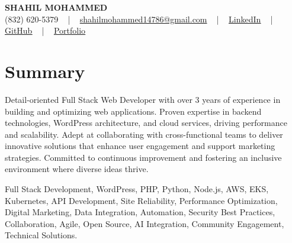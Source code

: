 \documentclass[letterpaper,10pt]{article}
\begin{document}
\begin{center}
    {\fontsize{14pt}{12pt}\selectfont \textbf{\MakeUppercase{Shahil Mohammed}}}\\ \vspace{2pt}
    \fontsize{10pt}{12pt}\selectfont (832) 620-5379 ~ | ~ \href{mailto:shahilmohammed14786@gmail.com}{shahilmohammed14786@gmail.com} ~ | ~  
    \href{https://www.linkedin.com/in/shahil-mohammed-9652931a1/}{\color{blue}\underline{LinkedIn}}  ~ | ~ 
    \href{https://github.com/freakbeast14}{\color{blue}\underline{GitHub}} ~ | ~ 
    \href{https://shahil-mohammed.netlify.app/}{\color{blue}\underline{Portfolio}}
    \vspace{-8pt}
\end{center}

\section{Summary}
\vspace{-2pt}\fontsize{8pt}{9pt}\selectfont
Detail-oriented Full Stack Web Developer with over 3 years of experience in building and optimizing web applications. Proven expertise in backend technologies, WordPress architecture, and cloud services, driving performance and scalability. Adept at collaborating with cross-functional teams to deliver innovative solutions that enhance user engagement and support marketing strategies. Committed to continuous improvement and fostering an inclusive environment where diverse ideas thrive. 
 \vspace{-5pt}
 
{\fontsize{1pt}{1pt}\selectfont\color{white}
Full Stack Development, WordPress, PHP, Python, Node.js, AWS, EKS, Kubernetes, API Development, Site Reliability, Performance Optimization, Digital Marketing, Data Integration, Automation, Security Best Practices, Collaboration, Agile, Open Source, AI Integration, Community Engagement, Technical Solutions.
}
\vspace{-8pt}

\vspace{-2pt}
\end{document}
